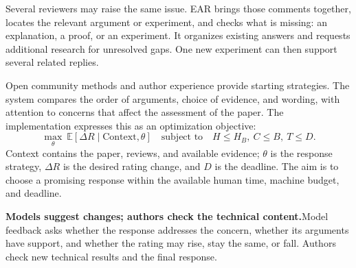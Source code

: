 
Several reviewers may raise the same issue. EAR brings those comments together, locates the relevant argument or experiment, and checks what is missing: an explanation, a proof, or an experiment. It organizes existing answers and requests additional research for unresolved gaps. One new experiment can then support several related replies.

Open community methods and author experience provide starting strategies. The system compares the order of arguments, choice of evidence, and wording, with attention to concerns that affect the assessment of the paper. The implementation expresses this as an optimization objective:
\[
\max_{\theta}\ \mathbb E[\Delta R\mid\mathrm{Context},\theta]
\quad\text{subject to}\quad H\le H_B,\ C\le B,\ T\le D.
\]
Context contains the paper, reviews, and available evidence; $\theta$ is the response strategy, $\Delta R$ is the desired rating change, and $D$ is the deadline. The aim is to choose a promising response within the available human time, machine budget, and deadline.

\begin{insight}
\textbf{Models suggest changes; authors check the technical content.}\quad Model feedback asks whether the response addresses the concern, whether its arguments have support, and whether the rating may rise, stay the same, or fall. Authors check new technical results and the final response.
\end{insight}



